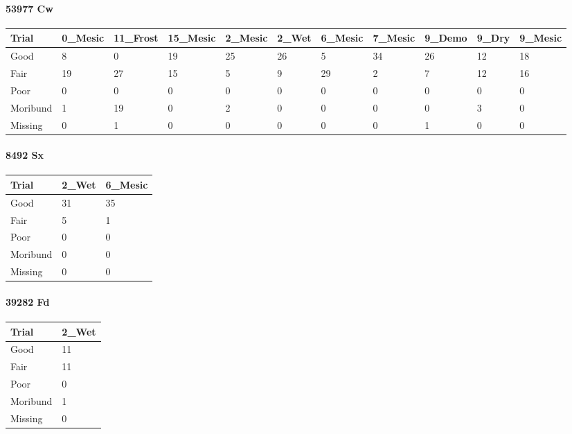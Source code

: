 \documentclass[
]{article}
\begin{document}
\hypertarget{cw-3}{%
\paragraph{53977 Cw}\label{cw-3}}

\begin{tabular}{l|l|l|l|l|l|l|l|l|l|l}
\hline
Trial & 0\_Mesic & 11\_Frost & 15\_Mesic & 2\_Mesic & 2\_Wet & 6\_Mesic & 7\_Mesic & 9\_Demo & 9\_Dry & 9\_Mesic\\
\hline
Good & 8 & 0 & 19 & 25 & 26 & 5 & 34 & 26 & 12 & 18\\
\hline
Fair & 19 & 27 & 15 & 5 & 9 & 29 & 2 & 7 & 12 & 16\\
\hline
Poor & 0 & 0 & 0 & 0 & 0 & 0 & 0 & 0 & 0 & 0\\
\hline
Moribund & 1 & 19 & 0 & 2 & 0 & 0 & 0 & 0 & 3 & 0\\
\hline
Missing & 0 & 1 & 0 & 0 & 0 & 0 & 0 & 1 & 0 & 0\\
\hline
\end{tabular}

\hypertarget{sx-4}{%
\paragraph{8492 Sx}\label{sx-4}}

\begin{tabular}{l|l|l}
\hline
Trial & 2\_Wet & 6\_Mesic\\
\hline
Good & 31 & 35\\
\hline
Fair & 5 & 1\\
\hline
Poor & 0 & 0\\
\hline
Moribund & 0 & 0\\
\hline
Missing & 0 & 0\\
\hline
\end{tabular}

\hypertarget{fd-4}{%
\paragraph{39282 Fd}\label{fd-4}}

\begin{tabular}{l|l}
\hline
Trial & 2\_Wet\\
\hline
Good & 11\\
\hline
Fair & 11\\
\hline
Poor & 0\\
\hline
Moribund & 1\\
\hline
Missing & 0\\
\hline
\end{tabular}
\end{document}
